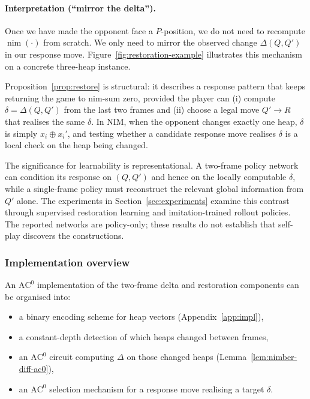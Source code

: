 \documentclass[11pt]{article}
\newcommand{\AC}{\mathrm{AC}}
\theoremstyle{plain}
\theoremstyle{definition}
\theoremstyle{remark}
\numberwithin{equation}{section}
\begin{document}
\paragraph{Interpretation (``mirror the delta'').}
Once we have made the opponent face a $P$-position, we do not need to recompute $\operatorname{nim}(\cdot)$ from scratch. We only need to mirror the observed change $\Delta(Q,Q')$ in our response move.
Figure~\ref{fig:restoration-example} illustrates this mechanism on a concrete three-heap instance.

Proposition~\ref{prop:restore} is structural: it describes a response pattern that keeps returning the game to nim-sum zero, provided the player can (i) compute $\delta=\Delta(Q,Q')$ from the last two frames and (ii) choose a legal move $Q'\to R$ that realises the same $\delta$. In NIM, when the opponent changes exactly one heap, $\delta$ is simply $x_i\oplus x_i'$, and testing whether a candidate response move realises $\delta$ is a local check on the heap being changed.

The significance for learnability is representational. A two-frame policy network can condition its response on $(Q,Q')$ and hence on the locally computable $\delta$, while a single-frame policy must reconstruct the relevant global information from $Q'$ alone. The experiments in Section~\ref{sec:experiments} examine this contrast through supervised restoration learning and imitation-trained rollout policies. The reported networks are policy-only; these results do not establish that self-play discovers the constructions.

\subsubsection{Implementation overview}
An $\AC^0$ implementation of the two-frame delta and restoration components can be organised into:
\begin{itemize}[leftmargin=*]
\item a binary encoding scheme for heap vectors (Appendix~\ref{app:impl}),
\item a constant-depth detection of which heaps changed between frames,
\item an $\AC^0$ circuit computing $\Delta$ on those changed heaps (Lemma~\ref{lem:nimber-diff-ac0}),
\item an $\AC^0$ selection mechanism for a response move realising a target $\delta$.
\end{itemize}

\end{document}
